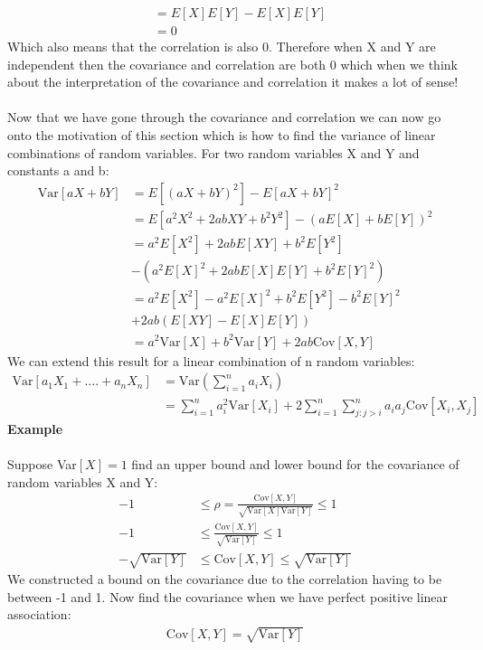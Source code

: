 \documentclass[,oneside]{article}
\begin{document}
\begin{enumerate}
\begin{align*}
&=E[X]E[Y]-E[X]E[Y]\\
&=0
\end{align*}
Which also means that the correlation is also 0. Therefore when X and Y are independent then the covariance and correlation are both 0 which when we think about the interpretation of the covariance and correlation it makes a lot of sense!\\ \\
Now that we have gone through the covariance and correlation we can now go onto the motivation of this section which is how to find the variance of linear combinations of random variables. For two random variables X and Y and constants a and b:
\begin{align*}
\text{Var}[aX+bY]&=E[(aX+bY)^2]-E[aX+bY]^2\\
&=E[a^2X^2+2abXY+b^2Y^2]-(aE[X]+bE[Y])^2\\
&=a^2E[X^2]+2abE[XY]+b^2E[Y^2]\\
&-(a^2E[X]^2+2abE[X]E[Y]+b^2E[Y]^2)\\
&=a^2E[X^2]-a^2E[X]^2+b^2E[Y^2]-b^2E[Y]^2\\
&+2ab(E[XY]-E[X]E[Y])\\
&=a^2\text{Var}[X]+b^2\text{Var}[Y]+2ab\text{Cov}[X,Y]
\end{align*}
We can extend this result for a linear combination of n random variables:
\begin{align*}
\text{Var}[a_1 X_1 +....+ a_n X_n]&=\text{Var} \left (\sum_{i=1}^{n} a_i X_i \right )\\
&= \sum_{i=1}^{n} a_i^2 \text{Var}[X_i] + 2 \sum_{i=1}^{n} \sum_{j:j>i}^{n} a_i a_j \text{Cov}[X_i,X_j]
\end{align*}
\textbf{Example}\\ \\
Suppose Var$[X]=1$ find an upper bound and lower bound for the covariance of random variables X and Y:
\begin{align*}
-1 &\leq \rho = \frac{\text{Cov}[X,Y]}{\sqrt{\text{Var}[X]\text{Var}[Y]}} \leq 1\\
-1 &\leq \frac{\text{Cov}[X,Y]}{\sqrt{\text{Var}[Y]}} \leq 1\\
-\sqrt{\text{Var}[Y]} &\leq \text{Cov}[X,Y] \leq \sqrt{\text{Var}[Y]}
\end{align*}
We constructed a bound on the covariance due to the correlation having to be between -1 and 1. Now find the covariance when we have perfect positive linear association:
\begin{align*}
\text{Cov}[X,Y] = \sqrt{\text{Var}[Y]}

\end{align*}
\end{enumerate}
\end{document}
